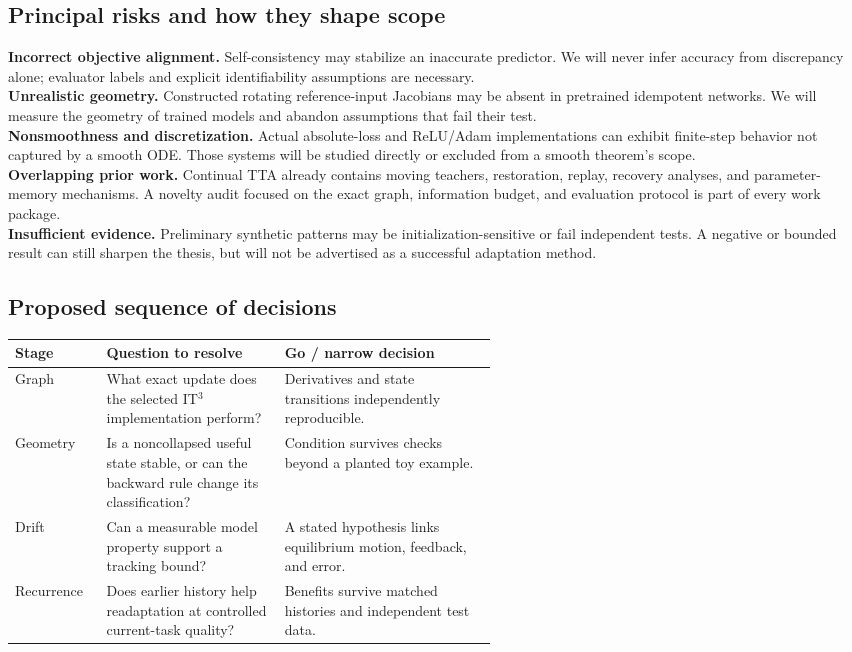 \documentclass[11pt,a4paper]{article}
\begin{document}
\subsection{Principal risks and how they shape scope}
\textbf{Incorrect objective alignment.} Self-consistency may stabilize an inaccurate predictor. We will never infer accuracy from discrepancy alone; evaluator labels and explicit identifiability assumptions are necessary.\\
\textbf{Unrealistic geometry.} Constructed rotating reference-input Jacobians may be absent in pretrained idempotent networks. We will measure the geometry of trained models and abandon assumptions that fail their test.\\
\textbf{Nonsmoothness and discretization.} Actual absolute-loss and ReLU/Adam implementations can exhibit finite-step behavior not captured by a smooth ODE. Those systems will be studied directly or excluded from a smooth theorem's scope.\\
\textbf{Overlapping prior work.} Continual TTA already contains moving teachers, restoration, replay, recovery analyses, and parameter-memory mechanisms. A novelty audit focused on the exact graph, information budget, and evaluation protocol is part of every work package.\\
\textbf{Insufficient evidence.} Preliminary synthetic patterns may be initialization-sensitive or fail independent tests. A negative or bounded result can still sharpen the thesis, but will not be advertised as a successful adaptation method.

\subsection{Proposed sequence of decisions}
\begin{center}
\small
\begin{tabularx}{\linewidth}{@{}p{0.19\linewidth}p{0.37\linewidth}X@{}}
\toprule
\textbf{Stage} & \textbf{Question to resolve} & \textbf{Go / narrow decision}\\
\midrule
Graph & What exact update does the selected IT$^3$ implementation perform? & Derivatives and state transitions independently reproducible.\\
Geometry & Is a noncollapsed useful state stable, or can the backward rule change its classification? & Condition survives checks beyond a planted toy example.\\
Drift & Can a measurable model property support a tracking bound? & A stated hypothesis links equilibrium motion, feedback, and error.\\
Recurrence & Does earlier history help readaptation at controlled current-task quality? & Benefits survive matched histories and independent test data.\\
\bottomrule
\end{tabularx}
\end{center}
\end{document}
